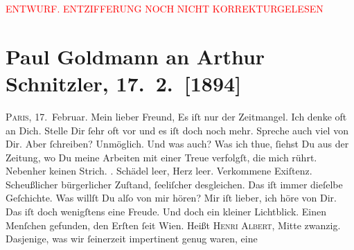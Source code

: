 
\begin{center}
            \textcolor{red}{ENTWURF. ENTZIFFERUNG NOCH NICHT KORREKTURGELESEN}
                      \end{center}
            
               \section[Paul Goldmann an Arthur Schnitzler, 17. 2. {[}1894{]}]{ Paul Goldmann an Arthur Schnitzler, 17. 2. {[}1894{]}}\nopagebreak{}\rehead{ }\begin{ledgroupsized}[t]{13cm}\normalsize\beginnumbering{} \toendnotes[C]{\smallbreak\pagebreak[2]} 
\toendnotes[C]{\smallbreak}\pstart
           \raggedleft{}{\pb}\textsc{Paris}, 17. Februar.\pend
           \pstart\center{}Mein lieber Freund,\pend\pstart
           Es iſt nur der Zeitmangel. Ich denke oft an Dich. Stelle Dir ſehr oft vor und es iſt
               doch noch mehr. Spreche auch viel von Dir. Aber ſchreiben? Unmöglich. Und was auch?
               Was ich thue, ſiehst Du aus der Zeitung, wo Du meine Arbeiten mit einer Treue verfolgſt, die mich rührt.
               Nebenher keinen Strich. \textsc{\label{K_L02609-12v}\label{K_L02609-12h}}. Schädel
               leer, Herz leer. Verkommene Exiſtenz. Scheußlicher bürgerlicher Zuſtand, ſeeliſcher
               desgleichen. {\pb}Das iſt immer dieſelbe Geſchichte. Was
               willſt Du alſo von mir hören? Mir iſt lieber, ich höre von Dir. Das iſt doch
               wenigſtens eine Freude.\pend
           \pstart
           Und doch ein kleiner Lichtblick. Einen Menſchen gefunden, den Erſten ſeit Wien. Heißt \textsc{Henri Albert}, Mitte zwanzig. Dasjenige, was wir ſeinerzeit impertinent genug waren, eine

\end{ledgroupsized}
